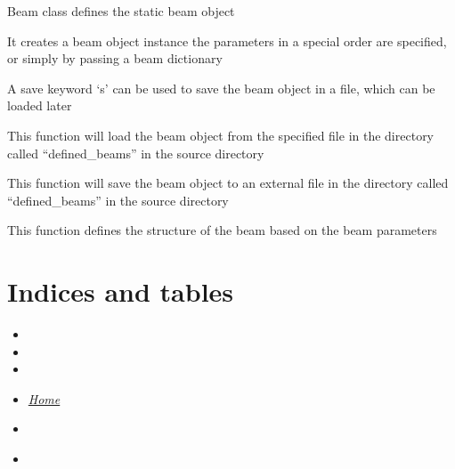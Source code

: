 \documentclass[letterpaper,10pt,english]{sphinxmanual}
\begin{document}
\begin{fulllineitems}
\label{beam:beam.staticbeam}
Beam class defines the static beam object

It creates a beam object instance the parameters in a special order are specified, or simply by passing a beam dictionary

A save keyword `s' can be used to save the beam object in a file, which can be loaded later

\begin{fulllineitems}
\label{beam:beam.staticbeam.load}
This function will load the beam object from the specified file in the directory called ``defined\_beams'' in the source directory

\end{fulllineitems}


\begin{fulllineitems}
\label{beam:beam.staticbeam.save}
This function will save the beam object to an external file in the directory called ``defined\_beams'' in the source directory

\end{fulllineitems}


\end{fulllineitems}


\begin{fulllineitems}
\label{beam:beam.structure}
This function defines the structure of the beam based on the beam parameters

\end{fulllineitems}



\section{Indices and tables}
\label{beam:indices-and-tables}\begin{itemize}
\item {} 

\item {} 

\item {} 

\item {} 
{\hyperref[index::doc]{\emph{\emph{Home}}}}

\item {} 
{\hyperref[index:index-label]{\emph{}}}

\item {} 
{\hyperref[beam:beam-label]{\emph{}}}

\end{itemize}
\end{document}

